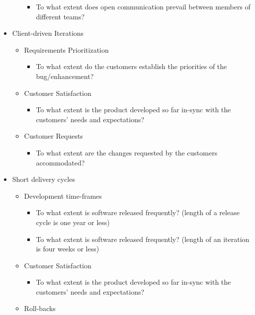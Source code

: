 \begin{appendices}
\begin{itemize}
\begin{itemize}
\begin{itemize}
					\item To what extent does open communication prevail between members of different teams?
				\end{itemize}
		\end{itemize}
	\item Client-driven Iterations
		\begin{itemize}
			\item Requirements Prioritization
				\begin{itemize}
					\item To what extent do the customers establish the priorities of the bug/enhancement?
				\end{itemize}
			\item Customer Satisfaction
				\begin{itemize}
					\item To what extent is the product developed so far in-sync with the customers' needs and expectations?
				\end{itemize}
			\item Customer Requests
				\begin{itemize}
					\item To what extent are the changes requested by the customers accommodated?
				\end{itemize}			
		\end{itemize}
	\item Short delivery cycles
		\begin{itemize}
			\item Development time-frames
				\begin{itemize}
					\item To what extent is software released frequently? (length of a release cycle is one year or less)
					\item To what extent is software released frequently? (length of an iteration is four weeks or less)
				\end{itemize}
			\item Customer Satisfaction
				\begin{itemize}
					\item To what extent is the product developed so far in-sync with the customers' needs and expectations?
				\end{itemize}
			\item Roll-backs
				\begin{itemize}

\end{itemize}
\end{itemize}
\end{itemize}
\end{appendices}
